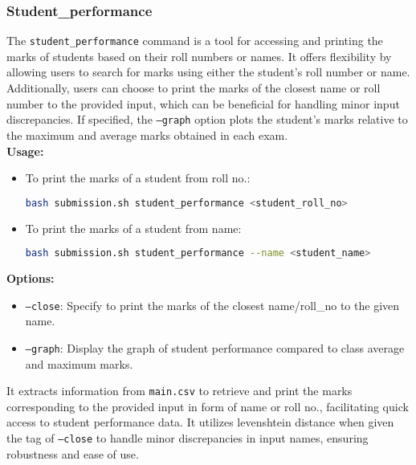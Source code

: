 \documentclass{article}
\begin{document}
\subsubsection{Student\_performance}
The \texttt{student\_performance} command is a tool for accessing and printing the marks of students based on their roll numbers or names. It offers flexibility by allowing users to search for marks using either the student's roll number or name. Additionally, users can choose to print the marks of the closest name or roll number to the provided input, which can be beneficial for handling minor input discrepancies. If specified, the \texttt{--graph} option plots the student's marks relative to the maximum and average marks obtained in each exam.\\
\textbf{Usage:}
\begin{itemize}
    \item To print the marks of a student from roll no.:
    \begin{lstlisting}[language=bash]
    bash submission.sh student_performance <student_roll_no>
    \end{lstlisting}
    \item To print the marks of a student from name:
    \begin{lstlisting}[language=bash]
    bash submission.sh student_performance --name <student_name>
    \end{lstlisting}
\end{itemize}

\textbf{Options:}
\begin{itemize}
    \item \texttt{--close}: Specify to print the marks of the closest name/roll\_no to the given name.
    \item \texttt{--graph}: Display the graph of student performance compared to class average and maximum marks.
\end{itemize}

It extracts information from \texttt{main.csv} to retrieve and print the marks corresponding to the provided input in form of name or roll no., facilitating quick access to student performance data. It utilizes levenshtein distance when given the tag of \texttt{--close} to handle minor discrepancies in input names, ensuring robustness and ease of use. 
\end{document}
